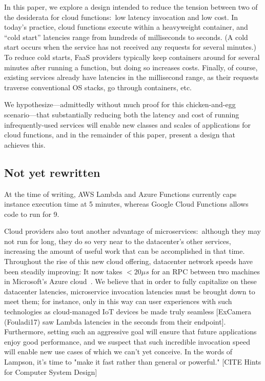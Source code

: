 In this paper, we explore a design intended to reduce the tension between two of
the desiderata for cloud functions:\ low latency invocation and low cost.  In
today's practice, cloud functions execute within a heavyweight container, and
``cold start'' latencies range from hundreds of milliseconds to seconds.  (A
cold start occurs when the service has not received any requests for several
minutes.)  To reduce cold starts, FaaS providers typically keep containers
around for several minutes after running a function, but doing so increases
costs.  Finally, of course, existing services already have latencies in the
millisecond range, as their requests traverse conventional OS stacks, go through
containers, etc.

We hypothesize---admittedly without much proof for this chicken-and-egg
scenario---that substantially reducing both the latency and cost of running
infrequently-used services will enable new classes and scales of applications
for cloud functions, and in the remainder of this paper, present a design that
achieves this.

\subsection{Not yet rewritten}

At the time of writing, AWS Lambda and Azure Functions currently caps instance execution time at 5 minutes, whereas Google Cloud Functions allows code to run for 9.

Cloud providers also tout another advantage of microservices:\ although they may not run for long, they do so very near to the datacenter's other services, increasing the amount of useful work that can be accomplished in that time.
Throughout the rise of this new cloud offering, datacenter network speeds have been steadily improving:
It now takes $<20\mu{}s$ for an RPC between two machines in Microsoft's Azure cloud~\cite{www-firestone-azure-latency}.
We believe that in order to fully capitalize on these datacenter latencies, microservice invocation latencies must be brought down to meet them; for instance, only in this way can user experiences with such technologies as cloud-managed IoT devices be made truly seamless [ExCamera (Fouladi17) saw Lambda latencies in the seconds from their endpoint].
Furthermore, setting such an aggressive goal will ensure that future applications enjoy good performance, and we suspect that such incredible invocation speed will enable new use cases of which we can't yet conceive.
In the words of Lampson, it's time to "make it fast rather than general or powerful." [CITE Hints for Computer System Design]

